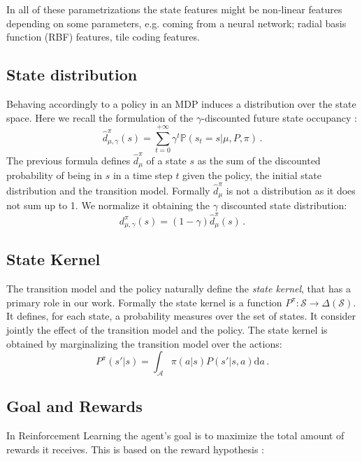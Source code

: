 In all of these parametrizations the state features might be non-linear features depending on some parameters, e.g. coming from a neural network; radial basis function (RBF) features, tile coding features.

\subsection{State distribution} \label{sec:state-distr}
Behaving accordingly to a policy in an MDP induces a distribution over the state space. Here we recall the formulation of the $\gamma$-discounted future state occupancy \citep{pol_grad_func_approx}:
\begin{equation}
	\hat{d}_{\mu,\gamma}^\pi(s) = \sum_{t=0}^{+\infty}\gamma^t \mathbb{P}(s_t = s | \mu, P, \pi) \, .
\end{equation}
The previous formula defines $\hat{d}_\mu^\pi$ of a state $s$ as the sum of the discounted probability of being in $s$ in a time step $t$ given the policy, the initial state distribution and the transition model.
Formally $\hat{d}_\mu^\pi$ is not a distribution as it does not sum up to 1. We normalize it obtaining the $\gamma$ discounted state distribution:
\begin{equation}
	d_{\mu,\gamma}^\pi(s) = (1 - \gamma) \hat{d}_\mu^\pi(s) \, .
\end{equation}
\subsection{State Kernel}
The transition model and the policy naturally define the \textit{state kernel}, that has a primary role in our work. Formally the state kernel is a function $P^\pi : \mathcal{S} \rightarrow \Delta(\mathcal{S})$. It defines, for each state, a probability measures over the set of states. It consider jointly the effect of the transition model and the policy.
The state kernel is obtained by marginalizing the transition model over the actions:
\begin{equation}
	P^\pi (s' | s) = \int_\mathcal{A} \pi(a | s) P(s' | s, a) \mathrm{d}a \, .
\end{equation}  
 \subsection{Goal and Rewards}
 In Reinforcement Learning the agent's goal is to maximize the total amount of rewards it receives. This is based on the reward hypothesis \citep{sutton_introduction}:
 	
